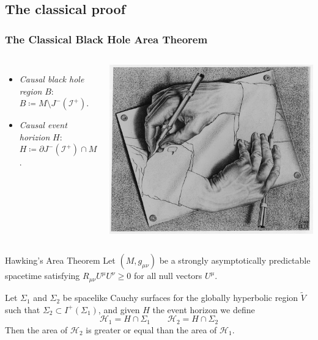 \documentclass[handout]{beamer}
\begin{document}
	\subsection{The classical proof}
	\begin{frame}
		\frametitle{The Classical Black Hole Area Theorem}

		\begin{columns}
			\begin{itemize}
				\item \emph{Causal black hole region} \(B\): \(B \coloneqq M \setminus J^-(\mathscr{I}^+)\).
				\item \emph{Causal event horizion} \(H\): \(H\coloneqq \partial J^-(\mathscr{I}^+) \cap M \).
			\end{itemize}
		
			\includegraphics[scale=0.15]{Immagini/escher.jpg}
		\end{columns}
		\begin{theoblock}{Hawking's Area Theorem}
			Let \((M, g_{\mu\nu})\) be a strongly asymptotically predictable spacetime satisfying \(R_{\mu\nu}U^{\mu}U^{\nu} \ge 0\) for all null vectors \(U^{\mu}\). 
			
			Let \(\Sigma_1\) and \(\Sigma_2\) be spacelike Cauchy surfaces for the globally hyperbolic region \(\tilde{V}\) such that \(\Sigma_2 \subset I^+(\Sigma_1)\), and given \(H\) the event horizon we define
			\[
			\mathscr{H}_1 = H \cap \Sigma_1 \quad \quad \mathscr{H}_2 = H \cap \Sigma_2
			\]
			Then the area of \(\mathscr{H}_2\) is greater or equal than the area of \(\mathscr{H}_1\).
		\end{theoblock}
	\end{frame}
\end{document}
